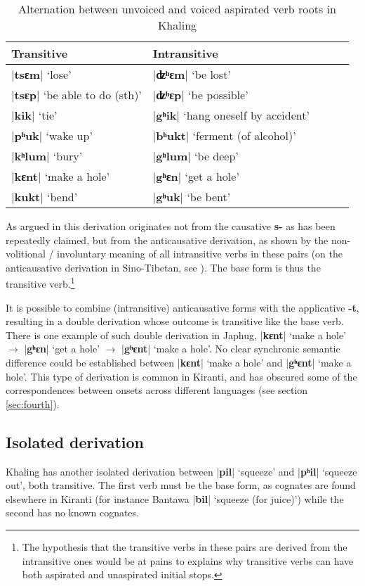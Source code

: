 \documentclass[oldfontcommands,oneside,a4paper,11pt]{article}
\newcommand{\ipa}[1]{\textbf{{\phon\mbox{#1}}}} %
\newcommand{\dhatu}[2]{|\ipa{#1}| `#2'}
\begin{document}
\begin{table}[H]
\caption{Alternation between unvoiced and voiced aspirated verb roots in Khaling} \centering \label{tab:anticaus}
\begin{tabular}{lllll}
\toprule
Transitive & Intransitive&  \\
\midrule
\dhatu{tsɛm}{lose} & \dhatu{ʣʰɛm}{be lost} \\
\dhatu{tsɛp}{be able to do (sth)} & \dhatu{ʣʰɛp}{be possible} \\
\dhatu{kik}{tie} & \dhatu{gʰik}{hang oneself by accident} \\
\dhatu{pʰuk}{wake up} & \dhatu{bʰukt}{ferment (of alcohol)} \\
\dhatu{kʰlum}{bury} & \dhatu{gʰlum}{be deep} \\
\midrule
\dhatu{kɛnt}{make a hole} & \dhatu{gʰɛn}{get a hole} \\
\dhatu{kukt}{bend} & \dhatu{gʰuk}{be bent}\\
\bottomrule
\end{tabular}
\end{table}

As argued in \citet{jacques15derivational.khaling} this derivation originates not from the causative \ipa{s-} as has been repeatedly claimed, but from the anticausative derivation, as shown by the non-volitional / involuntary meaning of all intransitive verbs in these pairs (on the anticausative derivation in Sino-Tibetan, see  \citealt{jacques15spontaneous, jacques15causative, hill14voicing}). The base form is thus the transitive verb.\footnote{The hypothesis that the transitive verbs in these pairs are derived from the intransitive ones would be at pains to explains why transitive verbs can have both aspirated and unaspirated initial stops.}

It is possible to combine (intransitive) anticausative forms with the applicative \ipa{-t}, resulting in a double derivation whose outcome is transitive like the base verb. There is one example of such double derivation in Japhug, \dhatu{kɛnt}{make a hole} $\rightarrow$  \dhatu{gʰɛn}{get a hole} $\rightarrow$  \dhatu{gʰɛnt}{make a hole}. No clear synchronic semantic difference could be established between \dhatu{kɛnt}{make a hole} and \dhatu{gʰɛnt}{make a hole}. This type of derivation is common in Kiranti, and has obscured some of the correspondences between onsets across different languages (see section \ref{sec:fourth}).

\subsection{Isolated derivation} \label{sec:isolated}
Khaling has another isolated derivation between \dhatu{pil}{squeeze} and  \dhatu{pʰil}{squeeze out}, both transitive. The first verb must be the base form, as cognates are found elsewhere in Kiranti (for instance Bantawa \dhatu{bil}{squeeze (for juice)}) while the second has no known cognates. 
\end{document}
